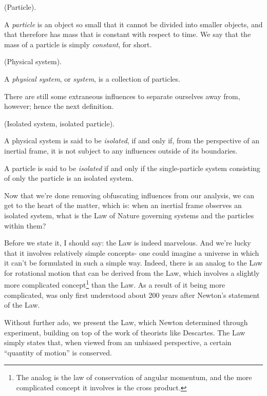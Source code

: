 \documentclass{article}
\begin{document}
\begin{defn}
    (Particle).

    A \textit{particle} is an object so small that it cannot be divided into smaller objects, and that therefore has mass that is constant with respect to time. We say that the mass of a particle is simply \textit{constant}, for short.
\end{defn}

\begin{defn}
    (Physical system).

    A \textit{physical system}, or \textit{system}, is a collection of particles.
\end{defn}

There are still some extraneous influences to separate ourselves away from, however; hence the next definition. 

\begin{defn}
    (Isolated system, isolated particle).

    A physical system is said to be \textit{isolated}, if and only if, from the perspective of an inertial frame, it is not subject to any influences outside of its boundaries.

    A particle is said to be \textit{isolated} if and only if the single-particle system consisting of only the particle is an isolated system. 
\end{defn}

Now that we're done removing obfuscating influences from our analysis, we can get to the heart of the matter, which is: when an inertial frame observes an isolated system, what is the Law of Nature governing systems and the particles within them? 

Before we state it, I should say: the Law is indeed marvelous. And we're lucky that it involves relatively simple concepts- one could imagine a universe in which it can't be formulated in such a simple way. Indeed, there is an analog to the Law for rotational motion  that can be derived from the Law, which involves a slightly more complicated concept\footnote{The analog is the law of conservation of angular momentum, and the more complicated concept it involves is the cross product.} than the Law. As a result of it being more complicated, was only first understood about 200 years after Newton's statement of the Law.

Without further ado, we present the Law, which Newton determined through experiment, building on top of the work of theorists like Descartes. The Law simply states that, when viewed from an unbiased perspective, a certain ``quantity of motion'' is conserved.
\end{document}
